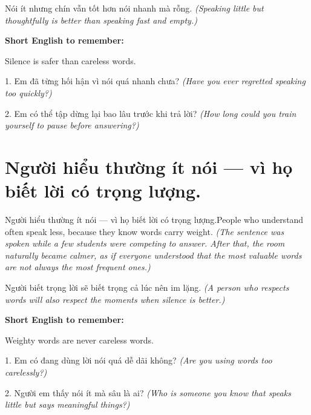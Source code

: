 \begin{baihoc}
Nói ít nhưng chín vẫn tốt hơn nói nhanh mà rỗng.
\textit{(Speaking little but thoughtfully is better than speaking fast and empty.)}
\end{baihoc}

\begin{ghinhoanh}
\textbf{Short English to remember:}

Silence is safer than careless words.

\end{ghinhoanh}

\begin{tuhocnhanh}
1. Em đã từng hối hận vì nói quá nhanh chưa? \textit{(Have you ever regretted speaking too quickly?)}

2. Em có thể tập dừng lại bao lâu trước khi trả lời? \textit{(How long could you train yourself to pause before answering?)}
\end{tuhocnhanh}
\ngancach


\section{Người hiểu thường ít nói — vì họ biết lời có trọng lượng.}
\begin{truyen}{Người hiểu thường ít nói — vì họ biết lời có trọng lượng.}{People who understand often speak less, because they know words carry weight.}
\textit{(The sentence was spoken while a few students were competing to answer. After that, the room naturally became calmer, as if everyone understood that the most valuable words are not always the most frequent ones.)}
\end{truyen}

\begin{baihoc}
Người biết trọng lời sẽ biết trọng cả lúc nên im lặng.
\textit{(A person who respects words will also respect the moments when silence is better.)}
\end{baihoc}

\begin{ghinhoanh}
\textbf{Short English to remember:}

Weighty words are never careless words.

\end{ghinhoanh}

\begin{tuhocnhanh}
1. Em có đang dùng lời nói quá dễ dãi không? \textit{(Are you using words too carelessly?)}

2. Người em thấy nói ít mà sâu là ai? \textit{(Who is someone you know that speaks little but says meaningful things?)}
\end{tuhocnhanh}
\ngancach


